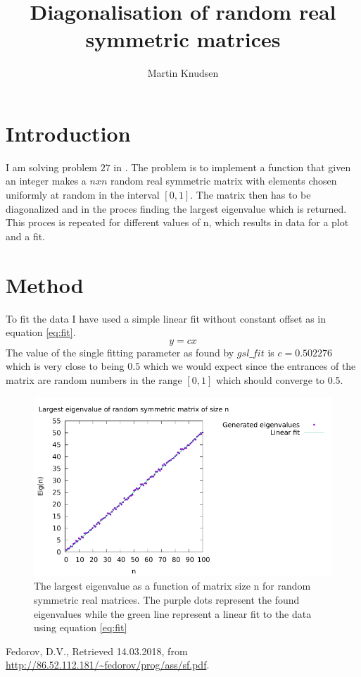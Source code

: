 \documentclass{report}
\author{Martin Knudsen}
\title{Diagonalisation of random real symmetric matrices}
\begin{document}
\maketitle

\section*{Introduction}
I am solving problem $27$ in \cite{fedorov}. 
The problem is to implement a function that given an integer makes a $n x n$ random real symmetric matrix with elements chosen uniformly at random in the interval $[0, 1]$. The matrix then has to be diagonalized and in the proces finding the largest eigenvalue which is returned. This proces is repeated for different values of n, which results in data for a plot and a fit. 


\section*{Method}
To fit the data I have used a simple linear fit without constant offset as in equation \eqref{eq:fit}. 
\begin{equation}
y = cx
\label{eq:fit}
\end{equation}
The value of the single fitting parameter as found by $gsl\_fit$ is $c=0.502276$ which is very close to being $0.5$ which we would expect since the entrances of the matrix are random numbers in the range $[0,1]$ which should converge to 0.5.   

\begin{figure}[tbhp]
\includegraphics[width = \textwidth]{Eigenvalue}
\caption{The largest eigenvalue as a function of matrix size n for random symmetric real matrices. The purple dots represent the found eigenvalues while the green line represent a linear fit to the data using equation \eqref{eq:fit} \label{fig:eigen}}
\end{figure}


\bgroup
\let\clearpage\relax
\begin{thebibliography}{9}

Fedorov, D.V., 
Retrieved 14.03.2018, 
from \url{http://86.52.112.181/~fedorov/prog/ass/sf.pdf}.

\end{thebibliography}
\egroup
\end{document}
